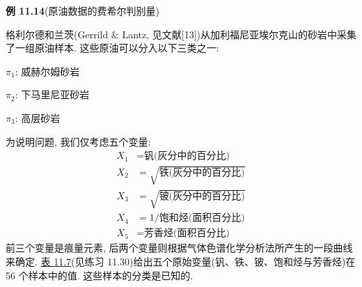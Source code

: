 \noindent\textbf{例 11.14}\quad (原油数据的费希尔判别量)

格利尔德和兰茨(Gerrild \& Lantz, 见文献[13])从加利福尼亚埃尔克山的砂岩中采集了一组原油样本. 这些原油可以分入以下三类之一:

$\pi_1$: 威赫尔姆砂岩

$\pi_2$: 下马里尼亚砂岩

$\pi_3$: 高层砂岩

为说明问题, 我们仅考虑五个变量:
\[
\begin{aligned}
X_1&=\text{钒(灰分中的百分比)}\\
X_2&=\sqrt{\text{铁(灰分中的百分比)}}\\
X_3&=\sqrt{\text{铍(灰分中的百分比)}}\\
X_4&=1/\text{饱和烃(面积百分比)}\\
X_5&=\text{芳香烃(面积百分比)}
\end{aligned}
\]
前三个变量是痕量元素, 后两个变量则根据气体色谱化学分析法所产生的一段曲线来确定. \hyperref[tab:11.7]{表 11.7}(见练习 11.30)给出五个原始变量(钒、铁、铍、饱和烃与芳香烃)在 56 个样本中的值. 这些样本的分类是已知的.
